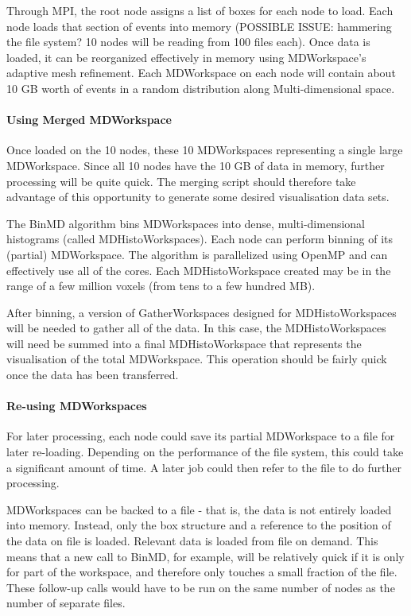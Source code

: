 Through MPI, the root node assigns a list of boxes for each node to load. Each node loads that section of events into memory (POSSIBLE ISSUE: hammering the file system? 10 nodes will be reading from 100 files each). Once data is loaded, it can be reorganized effectively in memory using MDWorkspace's adaptive mesh refinement. Each MDWorkspace on each node will contain about 10 GB worth of events in a random distribution along Multi-dimensional space.

\paragraph{Using Merged MDWorkspace}

Once loaded on the 10 nodes, these 10 MDWorkspaces representing a single large MDWorkspace. Since all 10 nodes have the 10 GB of data in memory, further processing will be quite quick. The merging script should therefore take advantage of this opportunity to generate some desired visualisation data sets.

The BinMD algorithm bins MDWorkspaces into dense, multi-dimensional histograms (called MDHistoWorkspaces). Each node can perform binning of its (partial) MDWorkspace. The algorithm is parallelized using OpenMP and can effectively use all of the cores. Each MDHistoWorkspace created may be in the range of a few million voxels (from tens to a few hundred MB).

After binning, a version of GatherWorkspaces designed for MDHistoWorkspaces will be needed to gather all of the data. In this case, the MDHistoWorkspaces will need be summed into a final MDHistoWorkspace that represents the visualisation of the total MDWorkspace. This operation should be fairly quick once the data has been transferred.

\paragraph{Re-using MDWorkspaces}

For later processing, each node could save its partial MDWorkspace to a file for later re-loading. Depending on the performance of the file system, this could take a significant amount of time. A later job could then refer to the file to do further processing.

MDWorkspaces can be backed to a file - that is, the data is not entirely loaded into memory. Instead, only the box structure and a reference to the position of the data on file is loaded. Relevant data is loaded from file on demand. This means that a new call to BinMD, for example, will be relatively quick if it is only for part of the workspace, and therefore only touches a small fraction of the file. These follow-up calls would have to be run on the same number of nodes as the number of separate files.

